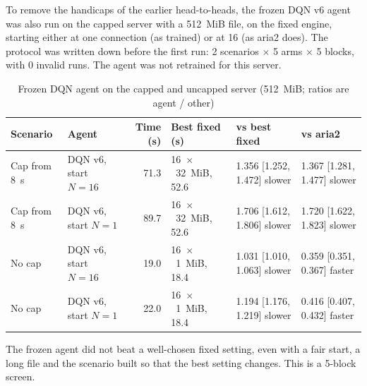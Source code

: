To remove the handicaps of the earlier head-to-heads, the frozen DQN v6 agent was also run on the capped server with a 512~MiB file, on the fixed engine, starting either at one connection (as trained) or at 16 (as aria2 does). The protocol was written down before the first run: 2 scenarios $\times$ 5 arms $\times$ 5 blocks, with 0 invalid runs. The agent was not retrained for this server.

\begin{table}[H]\centering
\caption{Frozen DQN agent on the capped and uncapped server (512~MiB; ratios are agent / other)}\label{tab:rlcap}
\small
\begin{tabularx}{\linewidth}{@{}llrlLL@{}}
\toprule
\textbf{Scenario} & \textbf{Agent} & \textbf{Time (s)} & \textbf{Best fixed (s)} & \textbf{vs best fixed} & \textbf{vs aria2}\\
\midrule
Cap from 8~s & DQN v6, start $N=16$ & 71.3 & 16~$\times$~32~MiB, 52.6 & 1.356 [1.252, 1.472] slower & 1.367 [1.281, 1.477] slower\\
Cap from 8~s & DQN v6, start $N=1$ & 89.7 & 16~$\times$~32~MiB, 52.6 & 1.706 [1.612, 1.806] slower & 1.720 [1.622, 1.823] slower\\
No cap & DQN v6, start $N=16$ & 19.0 & 16~$\times$~1~MiB, 18.4 & 1.031 [1.010, 1.063] slower & 0.359 [0.351, 0.367] faster\\
No cap & DQN v6, start $N=1$ & 22.0 & 16~$\times$~1~MiB, 18.4 & 1.194 [1.176, 1.219] slower & 0.416 [0.407, 0.432] faster\\
\bottomrule
\end{tabularx}
\end{table}
The frozen agent did not beat a well-chosen fixed setting, even with a fair start, a long file and the scenario built so that the best setting changes. This is a 5-block screen.
